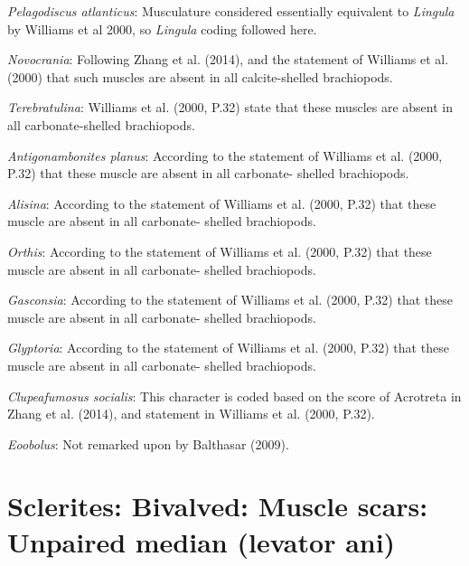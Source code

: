 \documentclass[]{book}
\theoremstyle{definition}
\theoremstyle{definition}
\theoremstyle{definition}
\theoremstyle{remark}
\begin{document}
\emph{Pelagodiscus atlanticus}: Musculature considered essentially
equivalent to \emph{Lingula} by Williams et al 2000, so \emph{Lingula}
coding followed here.

\emph{Novocrania}: Following Zhang et al. (2014), and the statement of
Williams et al. (2000) that such muscles are absent in all
calcite-shelled brachiopods.

\emph{Terebratulina}: Williams et al. (2000, P.32) state that these
muscles are absent in all carbonate-shelled brachiopods.

\emph{Antigonambonites planus}: According to the statement of Williams
et al. (2000, P.32) that these muscle are absent in all carbonate-
shelled brachiopods.

\emph{Alisina}: According to the statement of Williams et al. (2000,
P.32) that these muscle are absent in all carbonate- shelled
brachiopods.

\emph{Orthis}: According to the statement of Williams et al. (2000,
P.32) that these muscle are absent in all carbonate- shelled
brachiopods.

\emph{Gasconsia}: According to the statement of Williams et al. (2000,
P.32) that these muscle are absent in all carbonate- shelled
brachiopods.

\emph{Glyptoria}: According to the statement of Williams et al. (2000,
P.32) that these muscle are absent in all carbonate- shelled
brachiopods.

\emph{Clupeafumosus socialis}: This character is coded based on the
score of Acrotreta in Zhang et al. (2014), and statement in Williams et
al. (2000, P.32).

\emph{Eoobolus}: Not remarked upon by Balthasar (2009).

\hypertarget{sclerites-bivalved-muscle-scars-unpaired-median-levator-ani}{%
\section*{Sclerites: Bivalved: Muscle scars: Unpaired median (levator
ani)}\label{sclerites-bivalved-muscle-scars-unpaired-median-levator-ani}}
\end{document}

